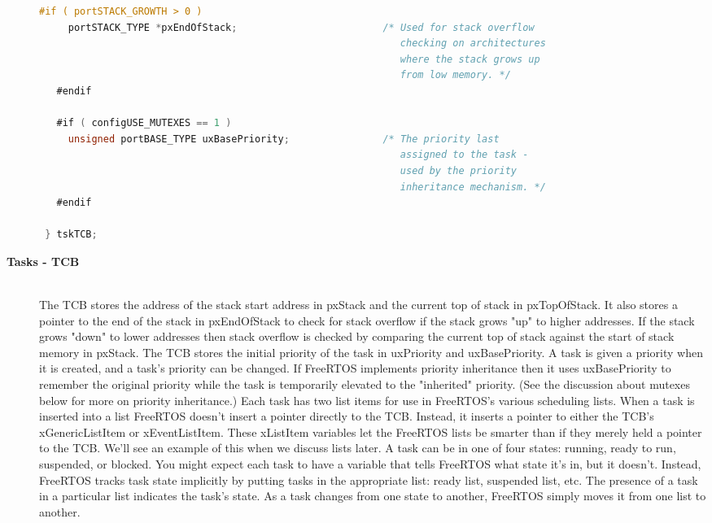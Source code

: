 \begin{description}
\begin{lstlisting}[language=C]
   #if ( portSTACK_GROWTH > 0 )
     portSTACK_TYPE *pxEndOfStack;                         /* Used for stack overflow
                                                              checking on architectures
                                                              where the stack grows up
                                                              from low memory. */
   #endif

   #if ( configUSE_MUTEXES == 1 )
     unsigned portBASE_TYPE uxBasePriority;                /* The priority last
                                                              assigned to the task -
                                                              used by the priority
                                                              inheritance mechanism. */
   #endif

 } tskTCB;
\end{lstlisting}

\os{\newpage}



\item[{\rot\bf Tasks - TCB}]~\\[-3ex]
\bi
\ite The TCB stores the address of the stack start address in pxStack and the current top of stack in pxTopOfStack. It also stores a pointer to the end of the stack in pxEndOfStack to check for stack overflow if the stack grows "up" to higher addresses. If the stack grows "down" to lower addresses then stack overflow is checked by comparing the current top of stack against the start of stack memory in pxStack.
\ite
\ite The TCB stores the initial priority of the task in uxPriority and uxBasePriority. A task is given a priority when it is created, and a task's priority can be changed. If FreeRTOS implements priority inheritance then it uses uxBasePriority to remember the original priority while the task is temporarily elevated to the "inherited" priority. (See the discussion about mutexes below for more on priority inheritance.)
\ite
\ite Each task has two list items for use in FreeRTOS's various scheduling lists. When a task is inserted into a list FreeRTOS doesn't insert a pointer directly to the TCB. Instead, it inserts a pointer to either the TCB's xGenericListItem or xEventListItem. These xListItem variables let the FreeRTOS lists be smarter than if they merely held a pointer to the TCB. We'll see an example of this when we discuss lists later.
\ite
\ite A task can be in one of four states: running, ready to run, suspended, or blocked. You might expect each task to have a variable that tells FreeRTOS what state it's in, but it doesn't. Instead, FreeRTOS tracks task state implicitly by putting tasks in the appropriate list: ready list, suspended list, etc. The presence of a task in a particular list indicates the task's state. As a task changes from one state to another, FreeRTOS simply moves it from one list to another.
\ei


\end{description}
